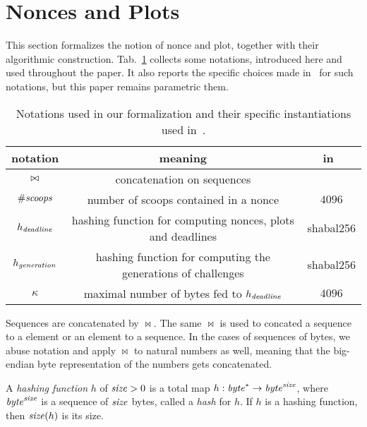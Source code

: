 \section{Nonces and Plots}\label{sec:nonces_and_plots}

This section formalizes the notion of nonce and plot, together with their
algorithmic construction. Tab.~\ref{tab:notations} collects some notations,
introduced here and used throughout the paper.
It also reports the specific choices
made in~\cite{SignumPlotting} for such notations, but this paper remains parametric
\wrt them.

\begin{table}[t]
\begin{center}
\begin{tabular}{|c|c|c|}
  \hline
  \textbf{notation} & \textbf{meaning} & \textbf{in~\cite{SignumPlotting}}\\\hline\hline

  $\operatorname*{\bowtie}$ & concatenation on sequences & \\\hline
  ${\#\mathit{scoops}}$ & number of scoops contained in a nonce & $4096$\\\hline

  $h_{\mathit{deadline}}$ & hashing function for computing nonces, plots and deadlines & shabal256\\\hline

  $h_{\mathit{generation}}$ & hashing function for computing the generations of challenges & shabal256\\\hline

  $\kappa$ & maximal number of bytes fed to $h_{\mathit{deadline}}$ & $4096$\\\hline

\end{tabular}
\end{center}
\caption{Notations used in our formalization and their specific instantiations
  used in~\cite{SignumPlotting}.}
\label{tab:notations}
\end{table}
%
\begin{definition}
  Sequences are concatenated by $\bowtie$. The same $\bowtie$
  is used to concated a sequence to a element or an element to a sequence.
  In the cases of sequences of bytes, we abuse notation
  and apply $\bowtie$ to natural numbers as well, meaning that
  the big-endian byte representation of the numbers gets concatenated.
\end{definition}
%
\begin{definition}
  A \emph{hashing function} $h$ of ${\mathit{size}}>0$
  is a total map $h:\mathit{byte}^*\to\mathit{byte}^{\mathit{size}}$, where
  $\mathit{byte}^{\mathit{size}}$ is a sequence of ${\mathit{size}}$ bytes, called a \emph{hash} for $h$.
  If $h$ is a hashing function, then ${\mathit{size}}(h)$ is its size.
\end{definition}
